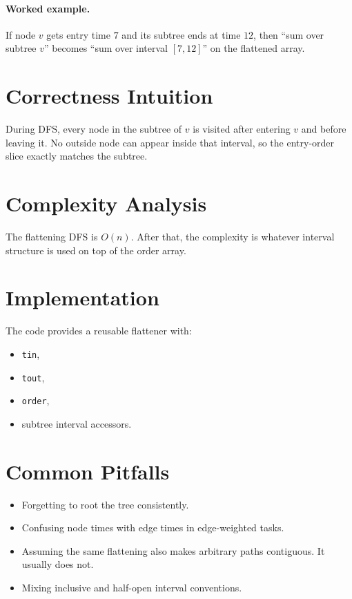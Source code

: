 \paragraph{Worked example.}
If node \(v\) gets entry time \(7\) and its subtree ends at time \(12\), then ``sum over subtree \(v\)'' becomes ``sum
over interval \([7,12]\)'' on the flattened array.

\section*{Correctness Intuition}

During DFS, every node in the subtree of \(v\) is visited after entering \(v\) and before leaving it. No outside node
can appear inside that interval, so the entry-order slice exactly matches the subtree.

\section*{Complexity Analysis}

The flattening DFS is \(O(n)\). After that, the complexity is whatever interval structure is used on top of the order
array.

\section*{Implementation}

The code provides a reusable flattener with:

\begin{itemize}
  \item \texttt{tin},
  \item \texttt{tout},
  \item \texttt{order},
  \item subtree interval accessors.
\end{itemize}

\section*{Common Pitfalls}

\begin{itemize}
  \item Forgetting to root the tree consistently.
  \item Confusing node times with edge times in edge-weighted tasks.
  \item Assuming the same flattening also makes arbitrary paths contiguous. It usually does not.
  \item Mixing inclusive and half-open interval conventions.
\end{itemize}

